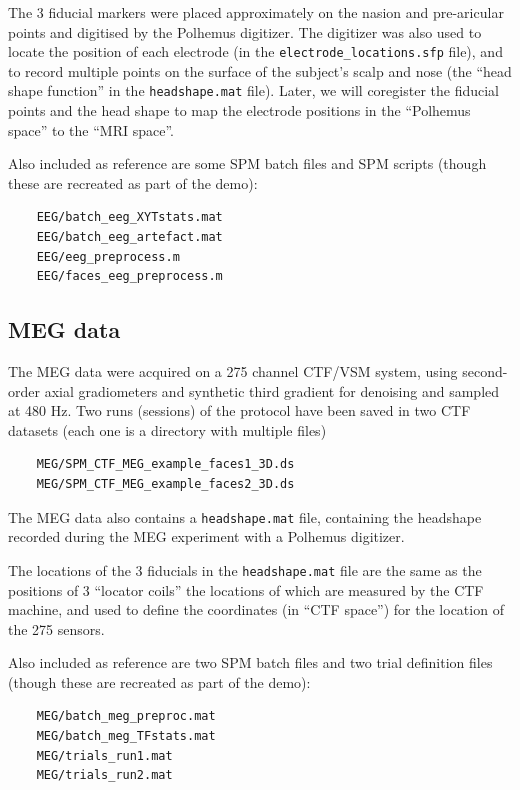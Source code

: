 The 3 fiducial markers were placed approximately on the nasion and pre-aricular points and digitised by the Polhemus digitizer. The digitizer was also used to locate the position of each electrode (in the \texttt{electrode\_locations.sfp} file), and to record multiple points on the surface of the  subject's scalp and nose (the ``head shape function'' in the \texttt{headshape.mat} file). Later, we will coregister the fiducial points and the head shape to map the electrode positions in the ``Polhemus space'' to the ``MRI space''.

Also included as reference are some SPM batch files and SPM scripts (though these are recreated as part of the demo):

\begin{verbatim}
    EEG/batch_eeg_XYTstats.mat
    EEG/batch_eeg_artefact.mat
    EEG/eeg_preprocess.m
    EEG/faces_eeg_preprocess.m
\end{verbatim}


\subsection{MEG data \label{multimodal:data:meg}}

The MEG data were acquired on a 275 channel CTF/VSM system, using second-order axial gradiometers and synthetic third gradient for denoising and sampled at 480 Hz. Two runs (sessions) of the protocol have been saved in two CTF datasets (each one is a directory with multiple files) 
\begin{verbatim}
    MEG/SPM_CTF_MEG_example_faces1_3D.ds
    MEG/SPM_CTF_MEG_example_faces2_3D.ds
\end{verbatim}
The MEG data also contains a \texttt{headshape.mat} file, containing the headshape recorded during the MEG experiment with a Polhemus digitizer.

The locations of the 3 fiducials in the \texttt{headshape.mat} file are the same as the positions of 3 ``locator coils'' the locations of which are measured by the CTF machine, and used to define the coordinates (in ``CTF space'') for the location of the 275 sensors.

Also included as reference are two SPM batch files and two trial definition files (though these are recreated as part of the demo):
\begin{verbatim}
    MEG/batch_meg_preproc.mat
    MEG/batch_meg_TFstats.mat
    MEG/trials_run1.mat
    MEG/trials_run2.mat
\end{verbatim}

